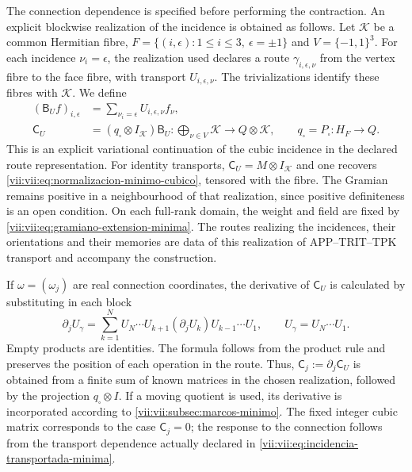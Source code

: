 The connection dependence is specified before performing the contraction. An explicit blockwise realization of the incidence is obtained as follows. Let \(\mathcal K\) be a common Hermitian fibre, \(F=\{(i,\epsilon):1\leq i\leq3,\ \epsilon=\pm1\}\) and \(V=\{-1,1\}^3\). For each incidence \(\nu_i=\epsilon\), the realization used declares a route \(\gamma_{i,\epsilon,\nu}\) from the vertex fibre to the face fibre, with transport \(U_{i,\epsilon,\nu}\). The trivializations identify these fibres with \(\mathcal K\). We define
\begin{equation}
 \begin{split}
 (\mathsf B_Uf)_{i,\epsilon}
   &=\sum_{\nu_i=\epsilon}U_{i,\epsilon,\nu}f_\nu,\\
 \mathsf C_U&=(q_\square\otimes I_{\mathcal K})\mathsf B_U:
   \bigoplus_{\nu\in V}\mathcal K\longrightarrow Q\otimes\mathcal K,
 \qquad q_\square=P_\square:H_F\to Q.
 \end{split}
 \label{vii:vii:eq:incidencia-transportada-minima}
\end{equation}
This is an explicit variational continuation of the cubic incidence in the declared route representation. For identity transports, \(\mathsf C_U=M\otimes I_{\mathcal K}\) and one recovers \eqref{vii:vii:eq:normalizacion-minimo-cubico}, tensored with the fibre. The Gramian remains positive in a neighbourhood of that realization, since positive definiteness is an open condition. On each full-rank domain, the weight and field are fixed by \eqref{vii:vii:eq:gramiano-extension-minima}. The routes realizing the incidences, their orientations and their memories are data of this realization of APP--TRIT--TPK transport and accompany the construction.

If \(\omega=(\omega_j)\) are real connection coordinates, the derivative of \(\mathsf C_U\) is calculated by substituting in each block
\begin{equation}
 \partial_j U_\gamma
 =\sum_{k=1}^{N}
    U_N\cdots U_{k+1}(\partial_jU_k)U_{k-1}\cdots U_1,
 \qquad U_\gamma=U_N\cdots U_1.
 \label{vii:vii:eq:derivada-incidencia-rutas}
\end{equation}
Empty products are identities. The formula follows from the product rule and preserves the position of each operation in the route. Thus, \(\mathsf C_j:=\partial_j\mathsf C_U\) is obtained from a finite sum of known matrices in the chosen realization, followed by the projection \(q_\square\otimes I\). If a moving quotient is used, its derivative is incorporated according to \ref{vii:vii:subsec:marcos-minimo}. The fixed integer cubic matrix corresponds to the case \(\mathsf C_j=0\); the response to the connection follows from the transport dependence actually declared in \eqref{vii:vii:eq:incidencia-transportada-minima}.

